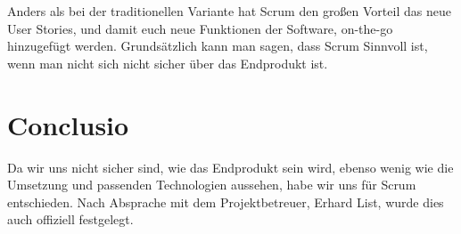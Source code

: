 Anders als bei der traditionellen Variante hat Scrum den großen Vorteil das neue User Stories, und damit euch neue Funktionen der Software, on-the-go hinzugefügt werden. Grundsätzlich kann man sagen, dass Scrum Sinnvoll ist, wenn man nicht sich nicht sicher über das Endprodukt ist.


\section{Conclusio}
Da wir uns nicht sicher sind, wie das Endprodukt sein wird, ebenso wenig wie die Umsetzung und passenden Technologien aussehen, habe wir uns für Scrum entschieden. Nach Absprache mit dem Projektbetreuer, Erhard List, wurde dies auch offiziell festgelegt.
